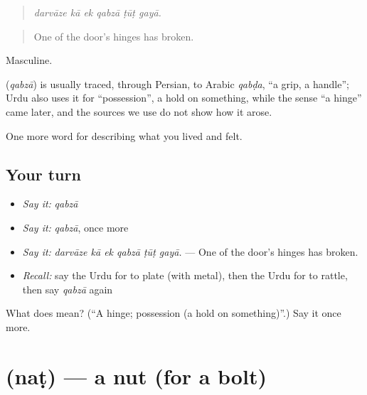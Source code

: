 \begin{quote}
     
\end{quote}

\begin{quote}
\emph{darvāze kā ek qabzā ṭūṭ gayā.}
\end{quote}

\begin{quote}
One of the door's hinges has broken.
\end{quote}

Masculine.

\begin{cousinweb}
\textbf{} (\emph{qabzā}) is usually traced, through Persian, to Arabic \emph{qabḍa}, \textquotedblleft{}a grip, a handle\textquotedblright{}; Urdu also uses it for \textquotedblleft{}possession\textquotedblright{}, a hold on something, while the sense \textquotedblleft{}a hinge\textquotedblright{} came later, and the sources we use do not show how it arose.
\end{cousinweb}

\begin{grammarlens}[title={What you've built}]
One more word for describing what you lived and felt.
\end{grammarlens}

\subsection*{Your turn}
\begin{itemize}
\raggedright
  \item \emph{Say it:} \emph{qabzā}
  \item \emph{Say it:} \emph{qabzā}, once more
  \item \emph{Say it:} \emph{darvāze kā ek qabzā ṭūṭ gayā.} — One of the door's hinges has broken.
  \item \emph{Recall:} say the Urdu for to plate (with metal), then the Urdu for to rattle, then say \emph{qabzā} again
\end{itemize}

\begin{tcolorbox}[breakable,colback=teal!4,colframe=teal!35!black,title={Before you move on}]
What does  mean? (\textquotedblleft{}A hinge; possession (a hold on something)\textquotedblright{}.) Say it once more.
\end{tcolorbox}
\section[\texorpdfstring{\ur{نٹ} (naṭ)}{نٹ (naṭ)}]{ (naṭ) — a nut (for a bolt)}

